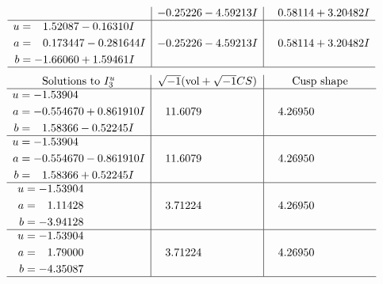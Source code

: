\documentclass[1p]{elsarticle_modified}
\theoremstyle{definition}
\newcommand{\I}{\sqrt{-1}}
\begin{document}
$$\begin{array}{c|c|c}
 & -0.25226 - 4.59213 I & \phantom{-}0.58114 + 3.20482 I \\ \hline\begin{aligned}
u &= \phantom{-}1.52087 - 0.16310 I \\
a &= \phantom{-}0.173447 - 0.281644 I \\
b &= -1.66060 + 1.59461 I\end{aligned}
 & -0.25226 - 4.59213 I & \phantom{-}0.58114 + 3.20482 I\\
 \hline 
 \end{array}$$\newpage$$\begin{array}{c|c|c}  
\text{Solutions to }I^u_{3}& \I (\text{vol} + \sqrt{-1}CS) & \text{Cusp shape}\\
 \hline 
\begin{aligned}
u &= -1.53904\phantom{ +0.000000I} \\
a &= -0.554670 + 0.861910 I \\
b &= \phantom{-}1.58366 - 0.52245 I\end{aligned}
 & \phantom{-}11.6079\phantom{ +0.000000I} & \phantom{-}4.26950\phantom{ +0.000000I} \\ \hline\begin{aligned}
u &= -1.53904\phantom{ +0.000000I} \\
a &= -0.554670 - 0.861910 I \\
b &= \phantom{-}1.58366 + 0.52245 I\end{aligned}
 & \phantom{-}11.6079\phantom{ +0.000000I} & \phantom{-}4.26950\phantom{ +0.000000I} \\ \hline\begin{aligned}
u &= -1.53904\phantom{ +0.000000I} \\
a &= \phantom{-}1.11428\phantom{ +0.000000I} \\
b &= -3.94128\phantom{ +0.000000I}\end{aligned}
 & \phantom{-}3.71224\phantom{ +0.000000I} & \phantom{-}4.26950\phantom{ +0.000000I} \\ \hline\begin{aligned}
u &= -1.53904\phantom{ +0.000000I} \\
a &= \phantom{-}1.79000\phantom{ +0.000000I} \\
b &= -4.35087\phantom{ +0.000000I}\end{aligned}
 & \phantom{-}3.71224\phantom{ +0.000000I} & \phantom{-}4.26950\phantom{ +0.000000I}\\
 \hline 
 \end{array}$$\newpage
\newpage\renewcommand{\arraystretch}{1}
\end{document}
